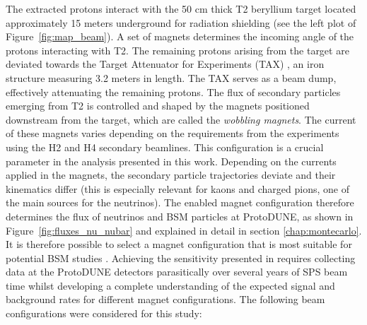  The extracted protons interact with the 50 cm thick T2 beryllium target located approximately 15 meters underground for radiation shielding \cite{coloma2024new} (see the left plot of Figure~\ref{fig:map_beam}). A set of magnets determines the incoming angle of the protons interacting with T2. The remaining protons arising from the target are deviated towards the Target Attenuator for Experiments (TAX) \cite{SBA_TAX_Description_CERN}, an iron structure measuring 3.2 meters in length. The TAX serves as a beam dump, effectively attenuating the remaining protons. The flux of secondary particles emerging from T2 is controlled and shaped by the magnets positioned downstream from the target, {which are called the \it wobbling magnets}. The current of these magnets varies depending on the requirements from the experiments using the H2 and H4 secondary beamlines. This configuration is a crucial parameter in the analysis presented in this work. Depending on the currents applied in the magnets, the secondary particle trajectories deviate and their kinematics differ (this is especially relevant for kaons and charged pions, one of the main sources for the neutrinos). The enabled magnet configuration therefore determines the flux of neutrinos and BSM particles at ProtoDUNE, as shown in Figure~\ref{fig:fluxes_nu_nubar} and explained in detail in section \ref{chap:montecarlo}. It is therefore possible to select a magnet configuration that is most suitable for potential BSM studies \cite{coloma2024new}. Achieving the sensitivity presented in \cite{coloma2024new} requires collecting data at the ProtoDUNE detectors parasitically over several years of SPS beam time whilst developing a complete understanding of the expected signal and background rates for different magnet configurations. The following beam configurations were considered for this study:

